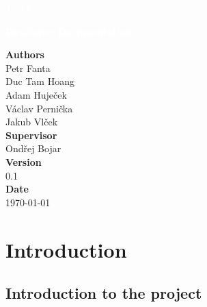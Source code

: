 \documentclass[12pt,a4paper]{report}
\begin{document}
\begin{titlepage}
\BgThispage

\vspace*{0.3\textheight}
\noindent
\textcolor{white}{\bigsf TextAn}

\vspace*{1cm}
\noindent
\textcolor{white}{\Huge\textbf{\textsf{Developer Documentation}}}

\vspace*{2cm}\par
\noindent
\begin{minipage}{0.35\linewidth}
\textbf{Authors} \\
Petr Fanta \\
Duc Tam Hoang \\
Adam Huječek \\
Václav Pernička \\
Jakub Vlček\vspace{40pt} \\
\textbf{Supervisor} \\
Ondřej Bojar\vspace{40pt} \\
\textbf{Version} \\
0.1\vspace{40pt} \\
\textbf{Date} \\
\today \\
\end{minipage}


\end{titlepage}
\restoregeometry

\tableofcontents



\chapter{Introduction}

\section{Introduction to the project}

\end{document}
